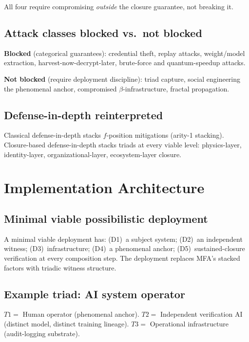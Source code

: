 \documentclass[11pt,a4paper]{article}
\theoremstyle{definition}
\theoremstyle{remark}
\begin{document}
All four require compromising \emph{outside} the closure guarantee, not breaking it.

\subsection{Attack classes blocked vs.\ not blocked}

\textbf{Blocked} (categorical guarantees): credential theft, replay attacks, weight/model extraction, harvest-now-decrypt-later, brute-force and quantum-speedup attacks.

\textbf{Not blocked} (require deployment discipline): triad capture, social engineering the phenomenal anchor, compromised $\beta$-infrastructure, fractal propagation.

\subsection{Defense-in-depth reinterpreted}

Classical defense-in-depth stacks $f$-position mitigations (arity-1 stacking). Closure-based defense-in-depth stacks triads at every viable level: physics-layer, identity-layer, organizational-layer, ecosystem-layer closure.

\section{Implementation Architecture}

\subsection{Minimal viable possibilistic deployment}

A minimal viable deployment has: (D1)~a subject system; (D2)~an independent witness; (D3)~infrastructure; (D4)~a phenomenal anchor; (D5)~sustained-closure verification at every composition step. The deployment replaces MFA's stacked factors with triadic witness structure.

\subsection{Example triad: AI system operator}

$T1 =$ Human operator (phenomenal anchor). $T2 =$ Independent verification AI (distinct model, distinct training lineage). $T3 =$ Operational infrastructure (audit-logging substrate).
\end{document}
